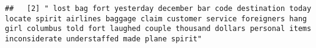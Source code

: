 \documentclass[
]{article}
\begin{document}
\begin{verbatim}
##   [2] " lost bag fort yesterday december bar code destination today locate spirit airlines baggage claim customer service foreigners hang girl columbus told fort laughed couple thousand dollars personal items inconsiderate understaffed made plane spirit"                                                                                                                                                                                                                                                                                                                                                                                                                                                                                                                                                                                                                                                                                                                                                                                                                                                                                                                                                                                                                                                                                                                                                                                                                                                                                                                                                                                                                                                                                                                                        

\end{verbatim}
\end{document}
